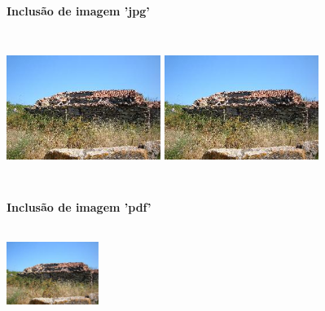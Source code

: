 \documentclass[a4paper,12pt]{article}
\begin{document}
\vskip 20mm
\centerline{\Large\bf Inclusão de imagem 'jpg'}
\par\vskip 5mm
\includegraphics[width=5cm,height=5cm]{dscf1683b_v1.jpg}
\hskip 20mm
\includegraphics[width=5cm,height=5cm,keepaspectratio]{dscf1683b_v1.jpg}

\vskip 20mm
\centerline{\Large\bf Inclusão de imagem 'pdf'}
\par\vskip 5mm
\includegraphics[width=3cm,height=3cm,keepaspectratio]{dscf1683b_v1.pdf}
\end{document}
